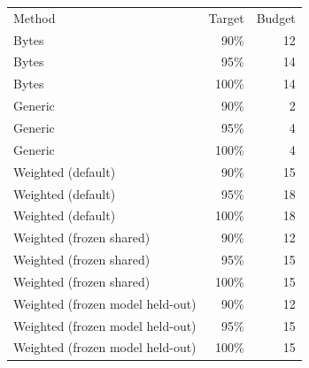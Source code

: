 \begin{tabular}{lrr}
Method & Target & Budget \\
Bytes & 90\% & 12 \\
Bytes & 95\% & 14 \\
Bytes & 100\% & 14 \\
Generic & 90\% & 2 \\
Generic & 95\% & 4 \\
Generic & 100\% & 4 \\
Weighted (default) & 90\% & 15 \\
Weighted (default) & 95\% & 18 \\
Weighted (default) & 100\% & 18 \\
Weighted (frozen shared) & 90\% & 12 \\
Weighted (frozen shared) & 95\% & 15 \\
Weighted (frozen shared) & 100\% & 15 \\
Weighted (frozen model held-out) & 90\% & 12 \\
Weighted (frozen model held-out) & 95\% & 15 \\
Weighted (frozen model held-out) & 100\% & 15 \\
\end{tabular}
